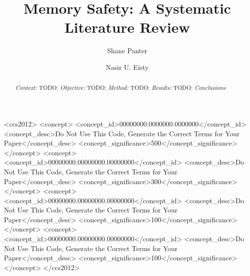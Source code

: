 \documentclass[sigconf]{acmart}
\begin{document}
\title{Memory Safety: A Systematic Literature Review}

\author{Shane Panter}

\author{Nasir U. Eisty}

\renewcommand{\shortauthors}{Panter et al.}

\begin{abstract}
    \textit{Context:}
    TODO:
    \textit{Objective:}
    TODO:
    \textit{Method:}
    TODO:
    \textit{Results:}
    TODO:
    \textit{Conclusions:}
\end{abstract}

\begin{CCSXML}
<ccs2012>
 <concept>
  <concept_id>00000000.0000000.0000000</concept_id>
  <concept_desc>Do Not Use This Code, Generate the Correct Terms for Your Paper</concept_desc>
  <concept_significance>500</concept_significance>
 </concept>
 <concept>
  <concept_id>00000000.00000000.00000000</concept_id>
  <concept_desc>Do Not Use This Code, Generate the Correct Terms for Your Paper</concept_desc>
  <concept_significance>300</concept_significance>
 </concept>
 <concept>
  <concept_id>00000000.00000000.00000000</concept_id>
  <concept_desc>Do Not Use This Code, Generate the Correct Terms for Your Paper</concept_desc>
  <concept_significance>100</concept_significance>
 </concept>
 <concept>
  <concept_id>00000000.00000000.00000000</concept_id>
  <concept_desc>Do Not Use This Code, Generate the Correct Terms for Your Paper</concept_desc>
  <concept_significance>100</concept_significance>
 </concept>
</ccs2012>
\end{CCSXML}


\end{document}
